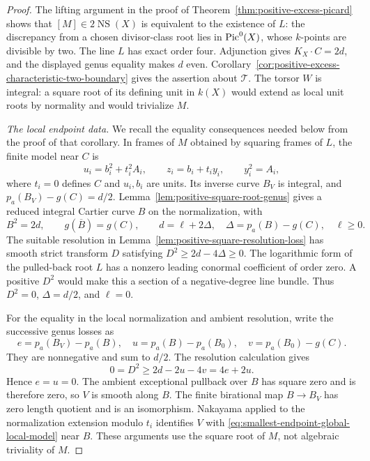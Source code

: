 \begin{proof}
The lifting argument in the proof of
Theorem~\ref{thm:positive-excess-picard} shows that
$[M]\in2\operatorname{NS}(X)$ is equivalent to the existence of $L$:
the discrepancy from a chosen divisor-class root lies in
$\operatorname{Pic}^0(X)$, whose $k$-points are divisible by two.
The line $L$ has exact order four.  Adjunction gives
$K_X\cdot C=2d$, and the displayed genus equality makes $d$ even.
Corollary~\ref{cor:positive-excess-characteristic-two-boundary}
gives the assertion about $\mathcal T$.
The torsor $W$ is integral: a square root of its defining unit in
$k(X)$ would extend as local unit roots by normality and would
trivialize $M$.

\smallskip\noindent
\emph{The local endpoint data.}
We recall the equality consequences needed below from the proof of
that corollary.  In frames of $M$ obtained by squaring frames of $L$,
the finite model near $C$ is
\begin{equation}\label{eq:smallest-endpoint-global-local-model}
 u_i=b_i^2+t_i^2A_i,\qquad
 z_i=b_i+t_i y_i,\qquad y_i^2=A_i,
\end{equation}
where $t_i=0$ defines $C$ and $u_i,b_i$ are units.
Its inverse curve $B_V$ is integral, and
$p_a(B_V)-g(C)=d/2$.
Lemma~\ref{lem:positive-square-root-genus} gives a reduced integral
Cartier curve $B$ on the normalization, with
\[
 B^2=2d,\qquad
 g(\overline B)=g(C),\qquad
 d=\ell+2\Delta,\quad
 \Delta=p_a(B)-g(C),\quad\ell\ge0.
\]
The suitable resolution in
Lemma~\ref{lem:positive-square-resolution-loss} has smooth strict
transform $D$ satisfying $D^2\ge2d-4\Delta\ge0$.
The logarithmic form of the pulled-back root $L$ has a nonzero
leading conormal coefficient of order zero.  A positive $D^2$
would make this a section of a negative-degree line bundle.
Thus $D^2=0$, $\Delta=d/2$, and $\ell=0$.

For the equality in the local normalization and ambient resolution,
write the successive genus losses as
\[
 e=p_a(B_V)-p_a(B),\quad
 u=p_a(B)-p_a(B_0),\quad
 v=p_a(B_0)-g(C).
\]
They are nonnegative and sum to $d/2$.  The resolution calculation
gives
\[
 0=D^2\ge2d-2u-4v=4e+2u.
\]
Hence $e=u=0$.  The ambient exceptional pullback over $B$ has square
zero and is therefore zero, so $V$ is smooth along $B$.
The finite birational map $B\to B_V$ has zero length quotient
and is an isomorphism.  Nakayama applied to the normalization
extension modulo $t_i$ identifies $V$ with
\eqref{eq:smallest-endpoint-global-local-model} near $B$.
These arguments use the square root of $M$, not algebraic
triviality of $M$.


\end{proof}
